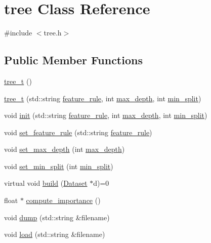 \hypertarget{classtree}{\section{tree Class Reference}
\label{classtree}
}


{\ttfamily \#include $<$tree.\+h$>$}

\subsection*{Public Member Functions}
\begin{DoxyCompactItemize}
\item 
\hyperlink{classtree_ab76e0197e552ba02bab77f06ef0af8ce}{tree\+\_\+t} ()
\item 
\hyperlink{classtree_a339b589372b72f6fe1ae169bc7401aee}{tree\+\_\+t} (std\+::string \hyperlink{classtree_a5aba3b77a347165517a20d5fab94382d}{feature\+\_\+rule}, int \hyperlink{classtree_a0a9f968fac827d3239be67488c34fb21}{max\+\_\+depth}, int \hyperlink{classtree_ae70cd626c0b50a0b8306a94a9e5e8fd7}{min\+\_\+split})
\item 
void \hyperlink{classtree_a1160f63037df412b4b3f4ad9d736bb85}{init} (std\+::string \hyperlink{classtree_a5aba3b77a347165517a20d5fab94382d}{feature\+\_\+rule}, int \hyperlink{classtree_a0a9f968fac827d3239be67488c34fb21}{max\+\_\+depth}, int \hyperlink{classtree_ae70cd626c0b50a0b8306a94a9e5e8fd7}{min\+\_\+split})
\item 
void \hyperlink{classtree_a4dc9068331f4249196d82c11045c4fba}{set\+\_\+feature\+\_\+rule} (std\+::string \hyperlink{classtree_a5aba3b77a347165517a20d5fab94382d}{feature\+\_\+rule})
\item 
void \hyperlink{classtree_a99011ba47a1c8da3bcbc237df65e5afe}{set\+\_\+max\+\_\+depth} (int \hyperlink{classtree_a0a9f968fac827d3239be67488c34fb21}{max\+\_\+depth})
\item 
void \hyperlink{classtree_afd722e513ec0e04c1cb3810d37c7d046}{set\+\_\+min\+\_\+split} (int \hyperlink{classtree_ae70cd626c0b50a0b8306a94a9e5e8fd7}{min\+\_\+split})
\item 
virtual void \hyperlink{classtree_a8fb18e2d3cd27f29a2071fd127cd6805}{build} (\hyperlink{class_dataset}{Dataset} $\ast$d)=0
\item 
float $\ast$ \hyperlink{classtree_af6574aaba296b8f8472d0c0d7a6f781e}{compute\+\_\+importance} ()
\item 
void \hyperlink{classtree_a67d4b4ac85b1b98f6ab6ad87bce5213a}{dump} (std\+::string \&filename)
\item 
void \hyperlink{classtree_a9d6d8200465e95e4573ab36941008b2a}{load} (std\+::string \&filename)
\end{DoxyCompactItemize}
